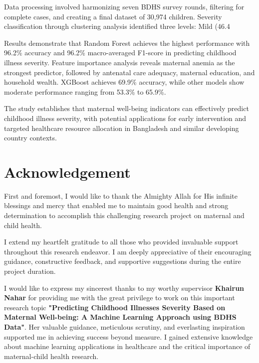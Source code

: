 \documentclass[12pt]{report}
\begin{document}
Data processing involved harmonizing seven BDHS survey rounds, filtering for complete cases, and creating a final dataset of 30,974 children. Severity classification through clustering analysis identified three levels: Mild (46.4%

Results demonstrate that Random Forest achieves the highest performance with 96.2\% accuracy and 96.2\% macro-averaged F1-score in predicting childhood illness severity. Feature importance analysis reveals maternal anemia as the strongest predictor, followed by antenatal care adequacy, maternal education, and household wealth. XGBoost achieves 69.9\% accuracy, while other models show moderate performance ranging from 53.3\% to 65.9\%.

The study establishes that maternal well-being indicators can effectively predict childhood illness severity, with potential applications for early intervention and targeted healthcare resource allocation in Bangladesh and similar developing country contexts.

\chapter*{Acknowledgement}
First and foremost, I would like to thank the Almighty Allah for His infinite blessings and mercy that enabled me to maintain good health and strong determination to accomplish this challenging research project on maternal and child health.

\noindent I extend my heartfelt gratitude to all those who provided invaluable support throughout this research endeavor. I am deeply appreciative of their encouraging guidance, constructive feedback, and supportive suggestions during the entire project duration.

\noindent I would like to express my sincerest thanks to my worthy supervisor \textbf{Khairun Nahar} for providing me with the great privilege to work on this important research topic \textbf{"Predicting Childhood Illnesses Severity Based on Maternal Well-being: A Machine Learning Approach using BDHS Data"}. Her valuable guidance, meticulous scrutiny, and everlasting inspiration supported me in achieving success beyond measure. I gained extensive knowledge about machine learning applications in healthcare and the critical importance of maternal-child health research.
\end{document}
